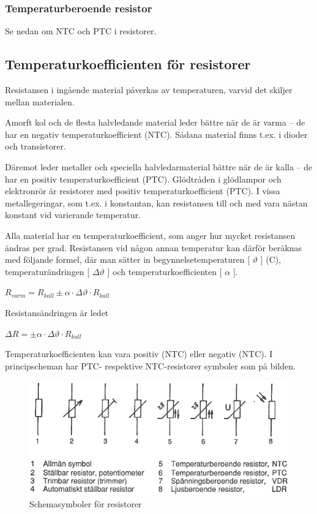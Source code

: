 \subsubsection{Temperaturberoende resistor}

Se nedan om NTC och PTC i resistorer.

\subsection{Temperaturkoefficienten för resistorer}

Resistansen i ingående material påverkas av temperaturen, varvid det skiljer
mellan materialen.

Amorft kol och de flesta halvledande material leder bättre när de är varma -- de
har en negativ temperaturkoefficient (NTC). Sådana material finns t.ex. i
dioder och transistorer.

Däremot leder metaller och speciella halvledarmaterial bättre när de är kalla
-- de har en positiv temperaturkoefficient (PTC). Glödtråden i glödlampor och
elektronrör är resistorer med positiv temperaturkoefficient (PTC). I vissa
metallegeringar, som t.ex. i konstantan, kan resistansen till och med vara
nästan konstant vid varierande temperatur.

Alla material har en temperaturkoefficient, som anger hur mycket resistansen
ändras per grad. Resistansen vid någon annan temperatur kan därför beräknas med
följande formel, där man sätter in begynnelsetemperaturen [ \(\vartheta\) ]
(\degree C), temperaturändringen [ \(\Delta \vartheta\) ] och
temperaturkoefficienten [ \(\alpha\) ].

\(R_{varm} = R_{kall} \pm \alpha \cdot \Delta \vartheta \cdot R_{kall}\)

Resistansändringen är ledet

\( \Delta R = \pm \alpha \cdot \Delta \vartheta \cdot R_{kall}\)

Temperaturkoefficienten kan vara positiv (NTC) eller negativ (NTC).
I principscheman har PTC- respektive NTC-resistorer symboler som på bilden.

\begin{figure}
\includegraphics[width=\textwidth]{images/cropped_pdfs/bild_2_2-01.pdf}
\caption{Schemasymboler för resistorer}
\label{fig:BildII2-1}
\end{figure}

